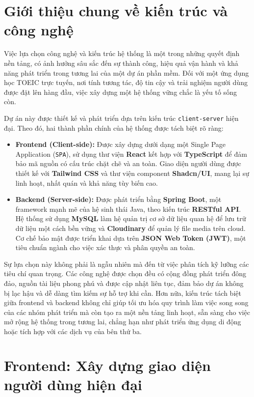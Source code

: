 \documentclass[../DoAn.tex]{subfiles}
\begin{document}
\section{Giới thiệu chung về kiến trúc và công nghệ}

Việc lựa chọn công nghệ và kiến trúc hệ thống là một trong những quyết định nền tảng, có ảnh hưởng sâu sắc đến sự thành công, hiệu quả vận hành và khả năng phát triển trong tương lai của một dự án phần mềm. Đối với một ứng dụng học TOEIC trực tuyến, nơi tính tương tác, độ tin cậy và trải nghiệm người dùng được đặt lên hàng đầu, việc xây dựng một hệ thống vững chắc là yếu tố sống còn.

Dự án này được thiết kế và phát triển dựa trên kiến trúc \texttt{client-server} hiện đại. Theo đó, hai thành phần chính của hệ thống được tách biệt rõ ràng:
\begin{itemize}
    \item \textbf{Frontend (Client-side):} Được xây dựng dưới dạng một Single Page Application (\texttt{SPA}), sử dụng thư viện \textbf{React} kết hợp với \textbf{TypeScript} để đảm bảo mã nguồn có cấu trúc chặt chẽ và an toàn. Giao diện người dùng được thiết kế với \textbf{Tailwind CSS} và thư viện component \textbf{Shadcn/UI}, mang lại sự linh hoạt, nhất quán và khả năng tùy biến cao.
    \item \textbf{Backend (Server-side):} Được phát triển bằng \textbf{Spring Boot}, một framework mạnh mẽ của hệ sinh thái Java, theo kiến trúc \textbf{RESTful API}. Hệ thống sử dụng \textbf{MySQL} làm hệ quản trị cơ sở dữ liệu quan hệ để lưu trữ dữ liệu một cách bền vững và \textbf{Cloudinary} để quản lý file media trên cloud. Cơ chế bảo mật được triển khai dựa trên \textbf{JSON Web Token (JWT)}, một tiêu chuẩn ngành cho việc xác thực và phân quyền an toàn.
\end{itemize}

Sự lựa chọn này không phải là ngẫu nhiên mà đến từ việc phân tích kỹ lưỡng các tiêu chí quan trọng. Các công nghệ được chọn đều có cộng đồng phát triển đông đảo, nguồn tài liệu phong phú và được cập nhật liên tục, đảm bảo dự án không bị lạc hậu và dễ dàng tìm kiếm sự hỗ trợ khi cần. Hơn nữa, kiến trúc tách biệt giữa frontend và backend không chỉ giúp tối ưu hóa quy trình làm việc song song của các nhóm phát triển mà còn tạo ra một nền tảng linh hoạt, sẵn sàng cho việc mở rộng hệ thống trong tương lai, chẳng hạn như phát triển ứng dụng di động hoặc tích hợp với các dịch vụ của bên thứ ba.

\section{Frontend: Xây dựng giao diện người dùng hiện đại}
\end{document}
